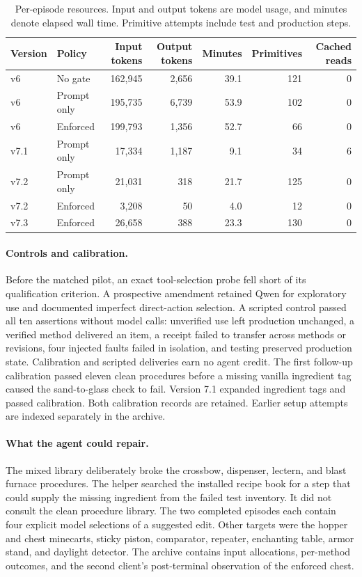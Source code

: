 \documentclass{article}
\begin{document}
\begin{table}[ht]
\centering\small
\caption{Per-episode resources. Input and output tokens are model usage, and minutes denote elapsed wall time. Primitive attempts include test and production steps.}
\label{tab:resources}
\setlength{\tabcolsep}{4pt}
\begin{tabular}{llrrrrr}
\toprule
Version & Policy & Input tokens & Output tokens & Minutes & Primitives & Cached reads\\
\midrule
v6 & No gate & 162,945 & 2,656 & 39.1 & 121 & 0\\
v6 & Prompt only & 195,735 & 6,739 & 53.9 & 102 & 0\\
v6 & Enforced & 199,793 & 1,356 & 52.7 & 66 & 0\\
v7.1 & Prompt only & 17,334 & 1,187 & 9.1 & 34 & 6\\
v7.2 & Prompt only & 21,031 & 318 & 21.7 & 125 & 0\\
v7.2 & Enforced & 3,208 & 50 & 4.0 & 12 & 0\\
v7.3 & Enforced & 26,658 & 388 & 23.3 & 130 & 0\\
\bottomrule
\end{tabular}
\end{table}

\paragraph{Controls and calibration.}
Before the matched pilot, an exact tool-selection probe fell short of its qualification criterion. A prospective amendment retained Qwen for exploratory use and documented imperfect direct-action selection. A scripted control passed all ten assertions without model calls: unverified use left production unchanged, a verified method delivered an item, a receipt failed to transfer across methods or revisions, four injected faults failed in isolation, and testing preserved production state. Calibration and scripted deliveries earn no agent credit. The first follow-up calibration passed eleven clean procedures before a missing vanilla ingredient tag caused the sand-to-glass check to fail. Version 7.1 expanded ingredient tags and passed calibration. Both calibration records are retained. Earlier setup attempts are indexed separately in the archive.

\paragraph{What the agent could repair.}
The mixed library deliberately broke the crossbow, dispenser, lectern, and blast furnace procedures. The helper searched the installed recipe book for a step that could supply the missing ingredient from the failed test inventory. It did not consult the clean procedure library. The two completed episodes each contain four explicit model selections of a suggested edit. Other targets were the hopper and chest minecarts, sticky piston, comparator, repeater, enchanting table, armor stand, and daylight detector. The archive contains input allocations, per-method outcomes, and the second client's post-terminal observation of the enforced chest.
\end{document}
